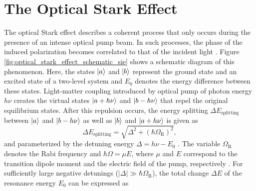 \clearpage

\section{The Optical Stark Effect}
\label{sec:optical_stark_effect}

The optical Stark effect describes a coherent process that only occurs during the presence of an intense optical pump beam. In such processes, the phase of the induced polarization becomes correlated to that of the incident light \cite{shah1996ultrafast}. Figure \ref{fig:optical_stark_effect_schematic_sie} shows a schematic diagram of this phenomenon. Here, the states $\ket{a}$ and $\ket{b}$ represent the ground state and an excited state of a two-level system and $E_0$ denotes the energy difference between these states. Light-matter coupling introduced by optical pump of photon energy $h \nu$ creates the virtual states $\ket{a + h \nu}$ and $\ket{b - h \nu}$ that repel the original equilibrium states. After this repulsion occurs, the energy splitting $\Delta E_\text{splitting}$ between $\ket{a}$  and $\ket{b - h \nu}$ as well as $\ket{b}$ and $\ket{a + h \nu}$ is given as
\begin{equation}
	\Delta E_\text{splitting} = \sqrt{\Delta^2 + (\hbar\Omega_\text{R})^2 },
\end{equation}
and parameterized by the detuning energy $\Delta = h \nu - E_0$ \cite{mysyrowicz1986dressed}. The variable $\Omega_\text{R}$ denotes the Rabi frequency and $\hbar \Omega = \mu E$, where $\mu$ and $E$ correspond to the transition dipole moment and the electric field of the pump, respectively
\cite{mysyrowicz1986dressed}. For sufficiently large negative detunings ($|\Delta| \gg \hbar \Omega_\text{R}$), the total change $\Delta E$ of the resonance energy $E_0$ can be expressed as

